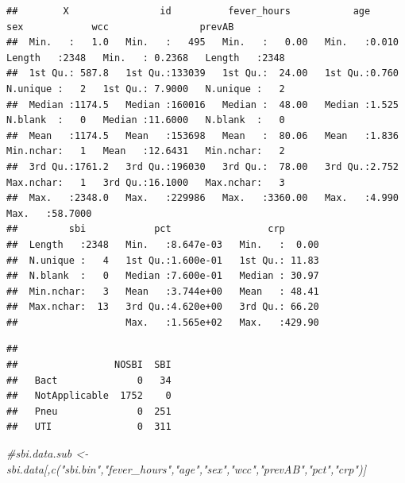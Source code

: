 \documentclass[
]{book}
\newenvironment{Shaded}{\begin{snugshade}}{\end{snugshade}}
\newcommand{\CommentTok}[1]{\textcolor[rgb]{0.56,0.35,0.01}{\textit{#1}}}
\newcommand{\FunctionTok}[1]{\textcolor[rgb]{0.13,0.29,0.53}{\textbf{#1}}}
\newcommand{\NormalTok}[1]{#1}
\newcommand{\OtherTok}[1]{\textcolor[rgb]{0.56,0.35,0.01}{#1}}
\newcommand{\SpecialCharTok}[1]{\textcolor[rgb]{0.81,0.36,0.00}{\textbf{#1}}}
\newcommand{\StringTok}[1]{\textcolor[rgb]{0.31,0.60,0.02}{#1}}
\begin{document}
\begin{verbatim}
##        X                id          fever_hours           age               sex            wcc                prevAB    
##  Min.   :   1.0   Min.   :   495   Min.   :   0.00   Min.   :0.010   Length   :2348   Min.   : 0.2368   Length   :2348  
##  1st Qu.: 587.8   1st Qu.:133039   1st Qu.:  24.00   1st Qu.:0.760   N.unique :   2   1st Qu.: 7.9000   N.unique :   2  
##  Median :1174.5   Median :160016   Median :  48.00   Median :1.525   N.blank  :   0   Median :11.6000   N.blank  :   0  
##  Mean   :1174.5   Mean   :153698   Mean   :  80.06   Mean   :1.836   Min.nchar:   1   Mean   :12.6431   Min.nchar:   2  
##  3rd Qu.:1761.2   3rd Qu.:196030   3rd Qu.:  78.00   3rd Qu.:2.752   Max.nchar:   1   3rd Qu.:16.1000   Max.nchar:   3  
##  Max.   :2348.0   Max.   :229986   Max.   :3360.00   Max.   :4.990                    Max.   :58.7000                   
##         sbi            pct                 crp        
##  Length   :2348   Min.   :8.647e-03   Min.   :  0.00  
##  N.unique :   4   1st Qu.:1.600e-01   1st Qu.: 11.83  
##  N.blank  :   0   Median :7.600e-01   Median : 30.97  
##  Min.nchar:   3   Mean   :3.744e+00   Mean   : 48.41  
##  Max.nchar:  13   3rd Qu.:4.620e+00   3rd Qu.: 66.20  
##                   Max.   :1.565e+02   Max.   :429.90
\end{verbatim}

\begin{Shaded}
\end{Shaded}

\begin{verbatim}
##                
##                 NOSBI  SBI
##   Bact              0   34
##   NotApplicable  1752    0
##   Pneu              0  251
##   UTI               0  311
\end{verbatim}

\begin{Shaded}
\begin{Highlighting}[]
\CommentTok{\#sbi.data.sub \textless{}{-} sbi.data[,c("sbi.bin","fever\_hours","age","sex","wcc","prevAB","pct","crp")]}
\end{Highlighting}
\end{Shaded}
\end{document}
